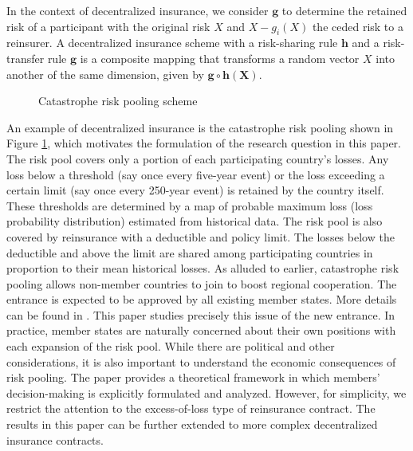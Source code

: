 \documentclass[fleqn,mnsc,nonblindrev]{informs4}
\begin{document}
In the context of decentralized insurance, we consider $\mathbf{g}$ to determine the retained risk of a participant with the original risk $X$ and $X-g_i(X)$ the ceded risk to a reinsurer. A decentralized insurance scheme with a risk-sharing rule $\mathbf{h}$ and a risk-transfer rule $\mathbf{g}$ is a composite mapping that transforms a random vector $X$ into another of the same dimension, given by  $\mathbf{g}\circ \mathbf{h}(\mathbf{X})$.
\begin{figure}[t]
\caption{Catastrophe risk pooling scheme}
\centering
{}
\label{fig:CAT}
\end{figure}
An example of decentralized insurance is the catastrophe risk pooling shown in Figure \ref{fig:CAT}, which motivates the formulation of the research question in this paper. The risk pool covers only a portion of each participating country's losses. Any loss below a threshold (say once every five-year event) or the loss exceeding a certain limit (say once every 250-year event) is retained by the country itself. These thresholds are determined by a map of probable maximum loss (loss probability distribution) estimated from historical data. The risk pool is also covered by reinsurance with a deductible and policy limit. The losses below the deductible and above the limit are shared among participating countries in proportion to their mean historical losses. As alluded to earlier, catastrophe risk pooling allows non-member countries to join to boost regional cooperation. The entrance is expected to be approved by all existing member states.  More details can be found in \cite{feng2024unified}. This paper studies precisely this issue of the new entrance. In practice, member states are naturally concerned about their own positions with each expansion of the risk pool. While there are political and other considerations, it is also important to understand the economic consequences of risk pooling. The paper provides a theoretical framework in which members' decision-making is explicitly formulated and analyzed. However, for simplicity, we restrict the attention to the excess-of-loss type of reinsurance contract. The results in this paper can be further extended to more complex decentralized insurance contracts.
\end{document}
